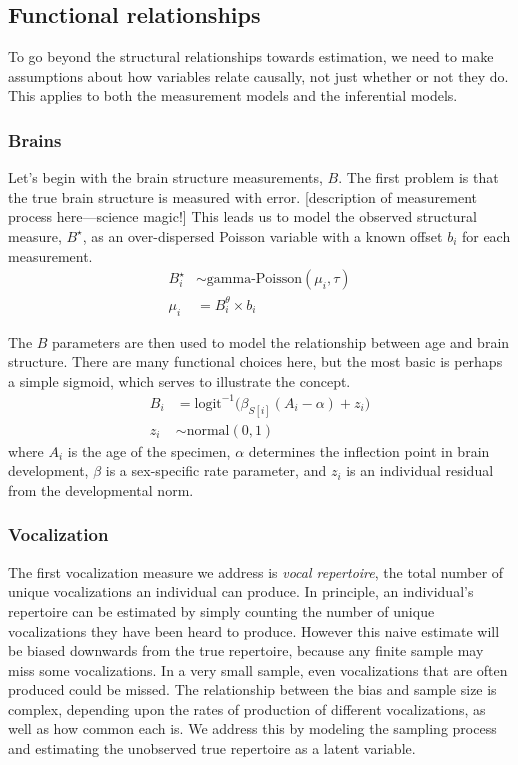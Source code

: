 \documentclass[reqno ,11pt]{amsart}
\begin{document}
\subsection{Functional relationships}

To go beyond the structural relationships towards estimation, we need to make assumptions about how variables relate causally, not just whether or not they do. This applies to both the measurement models and the inferential models.

\subsubsection{Brains}
Let's begin with the brain structure measurements, $B$. The first problem is that the true brain structure is measured with error.
[description of measurement process here---science magic!] 
This leads us to model the observed structural measure, $B^\star$, as an over-dispersed Poisson variable with a known offset $b_i$ for each measurement.
\begin{align*}
  B_i^\star &\sim \text{gamma-Poisson} ( \mu_i , \tau ) \\
  \mu_i &=  B_i^\theta  \times b_i
\end{align*}

The $B$ parameters are then used to model the relationship between age and brain structure. There are many functional choices here, but the most basic is perhaps a simple sigmoid, which serves to illustrate the concept.
\begin{align*}
  B_i &= \text{logit}^{-1} \big( \beta_{S[i]}(A_i - \alpha) + z_i \big)\\
  z_i &\sim \text{normal}(0,1)
\end{align*}
where $A_i$ is the age of the specimen, $\alpha$ determines the inflection point in brain development, $\beta$ is a sex-specific rate parameter, and $z_i$ is an individual residual from the developmental norm.

\subsubsection{Vocalization} 

The first vocalization measure we address is \emph{vocal repertoire}, the total number of unique vocalizations an individual can produce. In principle, an individual's repertoire can be estimated by simply counting the number of unique vocalizations they have been heard to produce. However this naive estimate will be biased downwards from the true repertoire, because any finite sample may miss some vocalizations. In a very small sample, even vocalizations that are often produced could be missed. The relationship between the bias and sample size is complex, depending upon the rates of production of different vocalizations, as well as how common each is. We address this by modeling the sampling process and estimating the unobserved true repertoire as a latent variable. 
\end{document}
